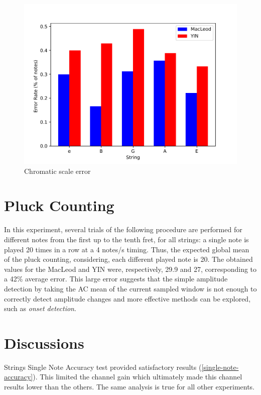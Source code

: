 \begin{figure}[!htpb]
  \centering
  \caption{Chromatic scale error}
  \label{chromatic-scale-error}
  \includegraphics[scale=0.85]{images/measurements/chromatic-scale-error}
\end{figure}

\section{Pluck Counting} \label{pluck-counting}
In this experiment, several trials of the following procedure are performed for different notes
from the first up to the tenth fret, for all strings: a single note is played 20 times in a row
at a 4 notes/s timing. Thus, the expected global mean of the pluck counting, considering, each
different played note is 20. The obtained values for the MacLeod and YIN were, respectively,
29.9 and 27, corresponding to a 42\% average error. This large error suggests that the simple
amplitude detection by taking the AC mean of the current sampled window is not enough to correctly
detect amplitude changes and more effective methods can be explored, such as \textit{onset detection}.

\section{Discussions}
Strings Single Note Accuracy test provided satisfactory results (\autoref{single-note-accuracy}).
This limited the channel gain which ultimately made this
channel results lower than the others. The same analysis is true for
all other experiments.


